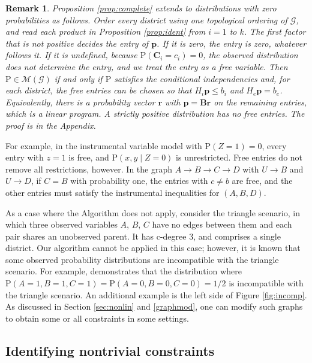 \documentclass[12pt]{article}
\newtheorem{remark}{Remark}
\def\Pr{{\mathrm{P}}}
\begin{document}
\begin{remark} \label{rmk:positivity}
Proposition \ref{prop:complete} extends to distributions with zero probabilities as follows. Order every district using one topological ordering of $\mathcal{G}$, and read each product in Proposition \ref{prop:ident} from $i = 1$ to $k$. The first factor that is not positive decides the entry of $\boldsymbol{p}$. If it is zero, the entry is zero, whatever follows it. If it is undefined, because $\Pr(\boldsymbol{C}_i = c_i) = 0$, the observed distribution does not determine the entry, and we treat the entry as a free variable. Then $\Pr \in \mathcal{M}(\mathcal{G})$ if and only if $\Pr$ satisfies the conditional independencies and, for each district, the free entries can be chosen so that $H_i \boldsymbol{p} \leq b_i$ and $H_e \boldsymbol{p} = b_e$. Equivalently, there is a probability vector $\boldsymbol{r}$ with $\boldsymbol{p} = \boldsymbol{B}\boldsymbol{r}$ on the remaining entries, which is a linear program. A strictly positive distribution has no free entries. The proof is in the Appendix.
\end{remark}

For example, in the instrumental variable model with $\Pr(Z = 1) = 0$, every entry with $z = 1$ is free, and $\Pr(x, y \mid Z = 0)$ is unrestricted. Free entries do not remove all restrictions, however. In the graph $A \rightarrow B \rightarrow C \rightarrow D$ with $U \rightarrow B$ and $U \rightarrow D$, if $C = B$ with probability one, the entries with $c \neq b$ are free, and the other entries must satisfy the instrumental inequalities for $(A, B, D)$. 

As a case where the Algorithm does not apply, consider the triangle scenario, in which three observed variables $A$, $B$, $C$ have no edges between them and each pair shares an unobserved parent. It has c-degree 3, and comprises a single district. Our algorithm cannot be applied in this case; however, it is known that some observed probability distributions are incompatible with the triangle scenario. For example, \citet{Wolfe_2019} demonstrates that the distribution where $\Pr(A = 1, B = 1, C = 1) = \Pr(A = 0, B = 0, C = 0) = 1/2$ is incompatible with the triangle scenario. An additional example is the left side of Figure \ref{fig:incomp}. As discussed in Section \ref{sec:nonlin} and \ref{graphmod}, one can modify such graphs to obtain some or all constraints in some settings. 



\subsection{Identifying nontrivial constraints} \label{sec:nontriv}
\end{document}
